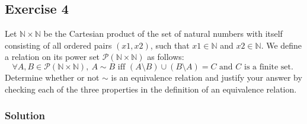 \documentclass[12pt]{article}
\begin{document}
\subsection*{Exercise 4}

Let $\mathbb{N} \times \mathbb{N}$ be the Cartesian product of the set of natural numbers with itself consisting of all ordered pairs $(x1, x2)$, such  that $x1 \in \mathbb{N}$ and $x2 \in \mathbb{N}$. We define a relation on its power set $\mathcal{P} (\mathbb{N} \times \mathbb{N})$ as follows:
\[ \forall A, B \in \mathcal{P}(\mathbb{N} \times \mathbb{N}),\ A \sim B \text{ iff } (A \setminus B) \cup (B \setminus A) = C \text{ and  } C \text{ is a finite set. } \]
Determine whether or not $\sim$ is an equivalence relation and justify your answer by checking each of the three properties in the definition of an equivalence relation.

\subsubsection*{Solution}
\end{document}
